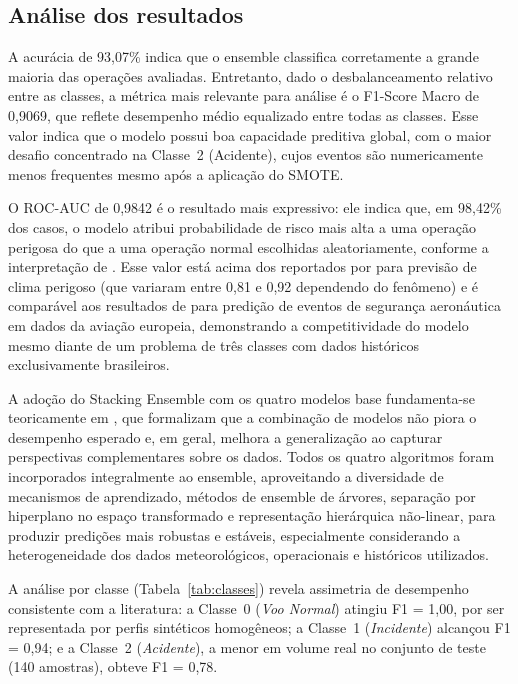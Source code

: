 \documentclass[english,brazilian]{UNISINOSartigo}
\begin{document}
\subsection{Análise dos resultados}

A acurácia de 93,07\% indica que o ensemble classifica corretamente a grande
maioria das operações avaliadas. Entretanto, dado o desbalanceamento relativo entre
as classes, a métrica mais relevante para análise é o F1-Score Macro de 0,9069, que
reflete desempenho médio equalizado entre todas as classes. Esse valor indica que
o modelo possui boa capacidade preditiva global, com o maior desafio concentrado
na Classe~2 (Acidente), cujos eventos são numericamente menos frequentes mesmo
após a aplicação do SMOTE.

O ROC-AUC de 0,9842 é o resultado mais expressivo: ele indica que, em 98,42\%
dos casos, o modelo atribui probabilidade de risco mais alta a uma operação
perigosa do que a uma operação normal escolhidas aleatoriamente, conforme a
interpretação de . Esse valor está acima dos reportados
por  para previsão de clima perigoso (que variaram entre 0,81
e 0,92 dependendo do fenômeno) e é comparável aos resultados de
 para predição de eventos de segurança aeronáutica em
dados da aviação europeia, demonstrando a competitividade do modelo mesmo diante
de um problema de três classes com dados históricos exclusivamente brasileiros.

A adoção do Stacking Ensemble com os quatro modelos base fundamenta-se
teoricamente em , que formalizam que a combinação de
modelos não piora o desempenho esperado e, em geral, melhora a generalização ao
capturar perspectivas complementares sobre os dados. Todos os quatro algoritmos
foram incorporados integralmente ao ensemble, aproveitando a diversidade de
mecanismos de aprendizado, métodos de ensemble de árvores, separação por
hiperplano no espaço transformado e representação hierárquica não-linear,
para produzir predições mais robustas e estáveis, especialmente considerando
a heterogeneidade dos dados meteorológicos, operacionais e históricos utilizados.

A análise por classe (Tabela~\ref{tab:classes}) revela assimetria de desempenho
consistente com a literatura: a Classe~0 (\textit{Voo Normal}) atingiu F1 = 1,00,
por ser representada por perfis sintéticos homogêneos; a Classe~1 (\textit{Incidente})
alcançou F1 = 0,94; e a Classe~2 (\textit{Acidente}), a menor em volume real no
conjunto de teste (140 amostras), obteve F1 = 0,78.
\end{document}
